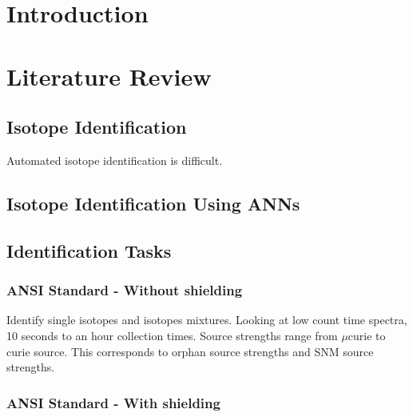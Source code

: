 \documentclass[thesis,tocnosub,noragright,centerchapter,12pt,fullpage]{uiucecethesis09}
\begin{document}
%

%




\tableofcontents



\chapter{Introduction}











\chapter{Literature Review}



\section{Isotope Identification}

Automated isotope identification is difficult. 


\section{Isotope Identification Using ANNs}




\section{Identification Tasks}

\subsection{ANSI Standard - Without shielding}

Identify single isotopes and isotopes mixtures. Looking at low count time spectra, 10 seconds to an hour collection times. Source strengths range from $\mu$curie to curie source. This corresponds to orphan source strengths and SNM source strengths. 



\subsection{ANSI Standard - With shielding}
\end{document}
